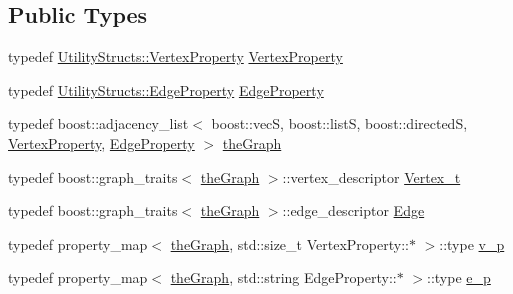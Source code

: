 \subsection*{Public Types}
\begin{DoxyCompactItemize}
\item 
typedef \hyperlink{struct_utility_structs_1_1_vertex_property}{Utility\+Structs\+::\+Vertex\+Property} \hyperlink{class_graph_component_a7c0fcb3f03bf188b7df520e0cdd364b7_a7c0fcb3f03bf188b7df520e0cdd364b7}{Vertex\+Property}
\item 
typedef \hyperlink{struct_utility_structs_1_1_edge_property}{Utility\+Structs\+::\+Edge\+Property} \hyperlink{class_graph_component_ae2f6ef4a3ac656d8213df42aa3d4c3b3_ae2f6ef4a3ac656d8213df42aa3d4c3b3}{Edge\+Property}
\item 
typedef boost\+::adjacency\+\_\+list$<$ boost\+::vecS, boost\+::listS, boost\+::directedS, \hyperlink{class_graph_component_a7c0fcb3f03bf188b7df520e0cdd364b7_a7c0fcb3f03bf188b7df520e0cdd364b7}{Vertex\+Property}, \hyperlink{class_graph_component_ae2f6ef4a3ac656d8213df42aa3d4c3b3_ae2f6ef4a3ac656d8213df42aa3d4c3b3}{Edge\+Property} $>$ \hyperlink{class_graph_component_a982e0748a6e1b8dc74986f5f8b3dca5c_a982e0748a6e1b8dc74986f5f8b3dca5c}{the\+Graph}
\item 
typedef boost\+::graph\+\_\+traits$<$ \hyperlink{class_graph_component_a982e0748a6e1b8dc74986f5f8b3dca5c_a982e0748a6e1b8dc74986f5f8b3dca5c}{the\+Graph} $>$\+::vertex\+\_\+descriptor \hyperlink{class_graph_component_ae67114a6ce5a001dc35e1996e1b45aa0_ae67114a6ce5a001dc35e1996e1b45aa0}{Vertex\+\_\+t}
\item 
typedef boost\+::graph\+\_\+traits$<$ \hyperlink{class_graph_component_a982e0748a6e1b8dc74986f5f8b3dca5c_a982e0748a6e1b8dc74986f5f8b3dca5c}{the\+Graph} $>$\+::edge\+\_\+descriptor \hyperlink{class_graph_component_aa7517b2af08aa717324076a645c73fe6_aa7517b2af08aa717324076a645c73fe6}{Edge}
\item 
typedef property\+\_\+map$<$ \hyperlink{class_graph_component_a982e0748a6e1b8dc74986f5f8b3dca5c_a982e0748a6e1b8dc74986f5f8b3dca5c}{the\+Graph}, std\+::size\+\_\+t Vertex\+Property\+::$\ast$ $>$\+::type \hyperlink{class_graph_component_ad40772702161324303e24463a63738e9_ad40772702161324303e24463a63738e9}{v\+\_\+p}
\item 
typedef property\+\_\+map$<$ \hyperlink{class_graph_component_a982e0748a6e1b8dc74986f5f8b3dca5c_a982e0748a6e1b8dc74986f5f8b3dca5c}{the\+Graph}, std\+::string Edge\+Property\+::$\ast$ $>$\+::type \hyperlink{class_graph_component_a22292bf7520fb476958c508d66f5d318_a22292bf7520fb476958c508d66f5d318}{e\+\_\+p}
\end{DoxyCompactItemize}
